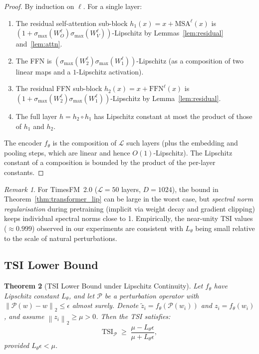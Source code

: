 \documentclass[12pt]{article}
\newtheorem{theorem}{Theorem}[section]
\theoremstyle{definition}
\theoremstyle{remark}
\newtheorem{remark}[theorem]{Remark}
\newcommand{\Pset}{\mathcal{P}}
\newcommand{\norm}[1]{\left\lVert #1 \right\rVert}
\newcommand{\tsi}{\mathrm{TSI}}
\newcommand{\smax}{\sigma_{\max}}
\begin{document}
\begin{proof}
By induction on $\ell$. For a single layer:
\begin{enumerate}[label=(\roman*)]
  \item The residual self-attention sub-block
        $h_1(x) = x + \mathrm{MSA}^\ell(x)$ is
        $(1 + \smax(W_O^\ell)\smax(W_V^\ell))$-Lipschitz by
        Lemmas~\ref{lem:residual} and~\ref{lem:attn}.
  \item The FFN is $(\smax(W_2^\ell)\smax(W_1^\ell))$-Lipschitz (as a
        composition of two linear maps and a $1$-Lipschitz activation).
  \item The residual FFN sub-block $h_2(x) = x + \mathrm{FFN}^\ell(x)$
        is $(1 + \smax(W_2^\ell)\smax(W_1^\ell))$-Lipschitz by
        Lemma~\ref{lem:residual}.
  \item The full layer $h = h_2 \circ h_1$ has Lipschitz constant at most
        the product of those of $h_1$ and $h_2$.
\end{enumerate}
The encoder $f_\theta$ is the composition of $\mathcal{L}$ such layers
(plus the embedding and pooling steps, which are linear and hence
$O(1)$-Lipschitz). The Lipschitz constant of a composition is bounded by
the product of the per-layer constants.
\end{proof}

\begin{remark}
For TimesFM~2.0 ($\mathcal{L} = 50$ layers, $D = 1024$), the bound in
Theorem~\ref{thm:transformer_lip} can be large in the worst case, but
\emph{spectral norm regularisation} during pretraining (implicit via weight
decay and gradient clipping) keeps individual spectral norms close to 1.
Empirically, the near-unity TSI values (${\approx}0.999$) observed in our
experiments are consistent with $L_\theta$ being small relative to the scale
of natural perturbations.
\end{remark}

\subsection{TSI Lower Bound}

\begin{theorem}[TSI Lower Bound under Lipschitz Continuity]
\label{thm:tsi_bound}
Let $f_\theta$ have Lipschitz constant $L_\theta$, and let $\Pset$ be a
perturbation operator with $\norm{\Pset(w) - w}_2 \leq \epsilon$ almost
surely. Denote $\tilde{z}_i = f_\theta(\Pset(w_i))$ and
$z_i = f_\theta(w_i)$, and assume $\norm{z_i}_2 \geq \mu > 0$.
Then the TSI satisfies:
\[
  \tsi_\Pset \;\geq\; \frac{\mu - L_\theta\epsilon}{\mu + L_\theta\epsilon},
\]
provided $L_\theta\epsilon < \mu$.
\end{theorem}
\end{document}

